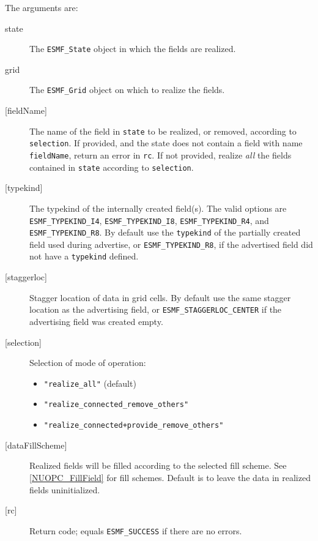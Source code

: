      The arguments are:
     \begin{description}
     \item[state]
       The {\tt ESMF\_State} object in which the fields are realized.
     \item[grid]
       The {\tt ESMF\_Grid} object on which to realize the fields.
     \item[{[fieldName]}]
       The name of the field in {\tt state} to be realized, or removed, according
       to {\tt selection}. If provided, and the state does not contain a field
       with name {\tt fieldName}, return an error in {\tt rc}. If not provided,
       realize {\em all} the fields contained in {\tt state} according to 
       {\tt selection}.
     \item[{[typekind]}]
       The typekind of the internally created field(s). The valid options are
       {\tt ESMF\_TYPEKIND\_I4}, {\tt ESMF\_TYPEKIND\_I8},
       {\tt ESMF\_TYPEKIND\_R4}, and {\tt ESMF\_TYPEKIND\_R8}.
       By default use the {\tt typekind} of the partially created field used
       during advertise, or {\tt ESMF\_TYPEKIND\_R8}, if the advertised field 
       did not have a {\tt typekind} defined.
     \item[{[staggerloc]}]
       Stagger location of data in grid cells. By default use the same
       stagger location as the advertising field, or 
       {\tt ESMF\_STAGGERLOC\_CENTER} if the advertising field was created empty.
     \item[{[selection]}]
       Selection of mode of operation:
       \begin{itemize}
       \item {\tt "realize\_all"} (default)
       \item {\tt "realize\_connected\_remove\_others"}
       \item {\tt "realize\_connected+provide\_remove\_others"}
       \end{itemize}
     \item[{[dataFillScheme]}]
       Realized fields will be filled according to the selected fill
       scheme. See \ref{NUOPC_FillField} for fill schemes. Default is to leave
       the data in realized fields uninitialized.
     \item[{[rc]}]
       Return code; equals {\tt ESMF\_SUCCESS} if there are no errors.
     \end{description}
   
 
